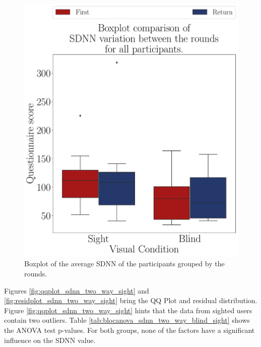 \begin{figure}[!htb]
\begin{minipage}{0.45\textwidth}
        \includegraphics[width = \textwidth]{Resultados/ECG/Figuras/pdf/boxplot_ecg_sdnn_4_rounds.pdf}
        \caption{Boxplot of the average SDNN of the participants grouped by the rounds.}
        \label{fig:boxplot_ecg_sdnn_4_rounds}
    \end{minipage}
\end{figure}
 
%
%

Figures \ref{fig:qqplot_sdnn_two_way_sight} and \ref{fig:residplot_sdnn_two_way_sight} bring the QQ Plot and residual distribution. Figure \ref{fig:qqplot_sdnn_two_way_sight} hints that the data from sighted users contain two outliers. Table \ref{tab:blocanova_sdnn_two_way_blind_sight} shows the ANOVA test p-values. For both groups, none of the factors have a significant influence on the SDNN value.

